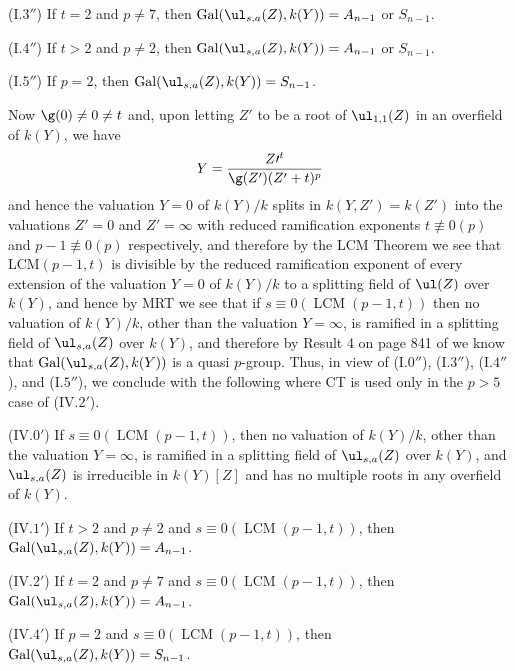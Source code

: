 (I.$3''$) If $t=2$ and $p\ne 7$, then 
$\operatorname{Gal}(\ul_{s,a}(Z),k(Y))=A_{n-1}$
or $S_{n-1}$.

(I.$4''$) If $t>2$ and $p\ne 2$, then 
$\operatorname{Gal}(\ul_{s,a}(Z),k(Y))=A_{n-1}$ 
or $S_{n-1}$.

(I.$5''$) If $p=2$, then 
$\operatorname{Gal}(\ul_{s,a}(Z),k(Y))=S_{n-1}$.

Now $\g(0)\ne 0\ne t$ and, upon letting $Z'$ to be a root 
of $\ul_{1,1}(Z)$
in an overfield of $k(Y)$, we have
$$
Y=\frac{Z\prime^t}{\g(Z')(Z'+t)^p}
$$
and hence the valuation $Y=0$ of $k(Y)/k$ splits in 
$k(Y,Z')=k(Z')$ into
the valuations $Z'=0$ and $Z'=\infty$ with reduced 
ramification exponents
$t\not\equiv 0(p)$ and $p-1\not\equiv 0(p)$ respectively, 
and therefore by the
LCM Theorem we see that LCM$(p-1,t)$ is divisible by the 
reduced ramification exponent of every extension of the 
valuation $Y=0$ of 
$k(Y)/k$ to a splitting field of $\ul(Z)$ over $k(Y)$, and 
hence by MRT
we see that if $s\equiv 0(\operatorname{LCM}(p-1,t))$ then 
no valuation
of $k(Y)/k$, other than the valuation $Y=\infty$, is 
ramified in a splitting
field of $\ul_{s,a}(Z)$ over $k(Y)$, and therefore by 
Result 4 on page 841
of \cite{A3} we know that 
$\operatorname{Gal}(\ul_{s,a}(Z),k(Y))$ is a quasi 
$p$-group.
Thus, in view of (I.$0''$), (I.$3''$), (I.$4''$), and 
(I.$5''$), we conclude 
with the following where CT is used only in the $p>5$ case 
of (IV.$2'$).

(IV.$0'$) If $s\equiv 0(\operatorname{LCM}(p-1,t))$, then 
no valuation
of $k(Y)/k$, other than the valuation $Y=\infty$, is 
ramified in a splitting
field of $\ul_{s,a}(Z)$ over $k(Y)$, and $\ul_{s,a}(Z)$ is 
irreducible
in $k(Y)[Z]$ and has no multiple roots in any overfield of 
$k(Y)$.

(IV.$1'$) If $t>2$ and $p\ne 2$ and $s\equiv 
0(\operatorname{LCM}(p-1,t))$,
then$\operatorname{Gal}(\ul_{s,a}(Z),k(Y))=A_{n-1}$.

(IV.$2'$) If $t=2$ and $p\ne 7$ and $s\equiv 
0(\operatorname{LCM}(p-1,t))$,
then$\operatorname{Gal}(\ul_{s,a}(Z),k(Y))=A_{n-1}$.

(IV.$4'$) If $p=2$ and $s\equiv 
0(\operatorname{LCM}(p-1,t))$, then 
$\operatorname{Gal}(\ul_{s,a}(Z),k(Y))=S_{n-1}$.

